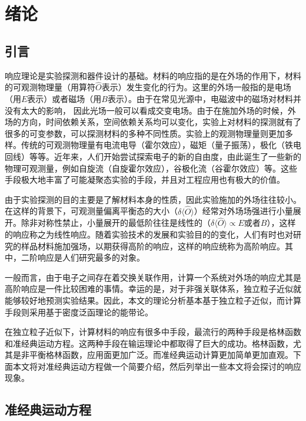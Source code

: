 \chapter{绪论}
\label{cha:intro}

\section{引言}

响应理论是实验探测和器件设计的基础。材料的响应指的是在外场的作用下，材料的可观测物理量（用算符$\hat{O}$表示）发生变化的行为。这里的外场一般指的是电场（用$E$表示）或者磁场（用$B$表示）。由于在常见光源中，电磁波中的磁场对材料并没有太大的影响， 因此光场一般可以看成交变电场。由于在施加外场的时候，外场的方向，时间依赖关系，空间依赖关系均可以变化，实验上对材料的探测就有了很多的可变参数，可以探测材料的多种不同性质。实验上的观测物理量则更加多样。传统的可观测物理量有电流电导（霍尔效应），磁矩（量子振荡），极化（铁电回线）等等。近年来，人们开始尝试探索电子的新的自由度，由此诞生了一些新的物理可观测量，例如自旋流（自旋霍尔效应），谷极化流（谷霍尔效应）等。这些手段极大地丰富了可能凝聚态实验的手段，并且对工程应用也有极大的价值。


由于实验探测的目的主要是了解材料本身的性质，因此实验施加的外场往往较小。在这样的背景下，可观测量偏离平衡态的大小（$\delta\langle\hat{O}\rangle$）经常对外场场强进行小量展开。除非对称性禁止，小量展开的最低阶往往是线性的（$\delta\langle\hat{O}\rangle \propto E$或者$B$），这样的响应称之为线性响应。随着实验技术的发展和实验目的的变化，人们有时也对研究的样品材料施加强场，以期获得高阶的响应，这样的响应统称为高阶响应。其中，二阶响应是人们研究最多的对象。

一般而言，由于电子之间存在着交换关联作用，计算一个系统对外场的响应尤其是高阶响应是一件比较困难的事情。幸运的是，对于非强关联体系，独立粒子近似就能够较好地预测实验结果。因此，本文的理论分析基本基于独立粒子近似，而计算手段则采用基于密度泛函理论的能带论。

在独立粒子近似下，计算材料的响应有很多中手段，最流行的两种手段是格林函数和准经典运动方程。这两种手段在输运理论中都取得了巨大的成功。格林函数，尤其是非平衡格林函数，应用面更加广泛。而准经典运动计算更加简单更加直观。下面本文将对准经典运动方程做一个简要介绍，然后列举出一些本文将会探讨的响应现象。

\section{准经典运动方程}

